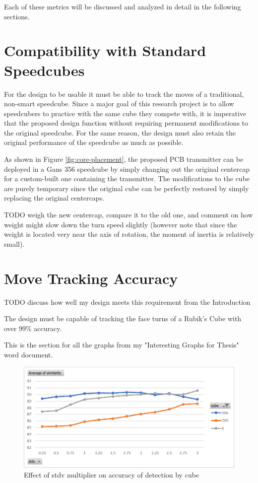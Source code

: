 Each of these metrics will be discussed and analyzed in detail in the following sections.

\section{Compatibility with Standard Speedcubes}
\label{sec:compatibility-with-standard-speedcubes}

For the design to be usable it must be able to track the moves of a
traditional, non-smart speedcube. Since a major goal of this research
project is to allow speedcubers to practice with the same cube they
compete with, it is imperative that the proposed design function
without requiring permanent modifications to the original speedcube.
For the same reason, the design must also retain the original
performance of the speedcube as much as possible.

As shown in Figure \ref{fig:core-placement}, the proposed PCB
transmitter can be deployed in a Gans 356 speedcube by simply changing
out the original centercap for a custom-built one containing the
transmitter. The modifications to the cube are purely temporary since
the original cube can be perfectly restored by simply replacing the
original centercaps.

TODO weigh the new centercap, compare it to the old one, and comment on
how weight might slow down the turn speed slightly (however note that
since the weight is located very near the axis of rotation, the moment
of inertia is relatively small).

\section{Move Tracking Accuracy}
\label{sec:move-tracking-accuracy}

TODO discuss how well my design meets this requirement from the Introduction

The design must be capable of tracking the face turns of a Rubik's Cube with over 99\% accuracy.

This is the section for all the graphs from my "Interesting Graphs for Thesis" word document.

\begin{figure}[h]
    \centering
    \caption{Effect of stdv multiplier on accuracy of detection by cube}
    \label{fig:similarity-by-cube}
    \includegraphics[width=0.75\linewidth]{Figures/7 Evaluation/similarity_by_cube.png}
\end{figure}

